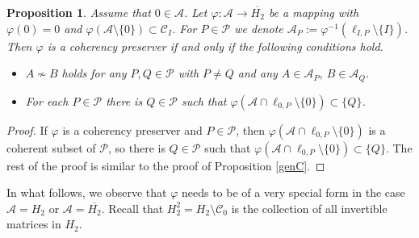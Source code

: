 \documentclass[10pt]{amsart}
\newtheorem{proposition}[theorem]{Proposition}
\theoremstyle{definition}
\theoremstyle{remark}
\numberwithin{subsection}{section}
\numberwithin{equation}{section}
\newcommand\cC{{\mathcal{C}}}
\newcommand\cP{{\mathcal{P}}}
\newcommand\oH{{\overline{H_2}}}
\begin{document}
\begin{proposition}\label{gena}
Assume that $0\in \mathcal{A}$. 
Let $\varphi\colon \mathcal{A}\to \oH$ be a mapping with $\varphi(0)=0$ and $\varphi(\mathcal{A}\setminus \{0\})\subset\mathcal{C}_I$. 
For $P\in \cP$ we denote $\mathcal{A}_P :=\varphi^{-1}(\ell_{I, P}\setminus \{I\})$.
Then $\varphi$ is a coherency preserver if and only if the following conditions hold. 
\begin{itemize}
\item $A\not\sim B$ holds for any $P, Q\in \mathcal{P}$ with $P \not=Q$ and any $A\in \mathcal{A}_P$, $B\in \mathcal{A}_Q$. 
\item For each $P\in \cP$ there is $Q\in \cP$ such that $\varphi(\mathcal{A}\cap \ell_{0, P}\setminus\{0\})\subset \{Q\}$.
\end{itemize}
\end{proposition}
\begin{proof}
If $\varphi$ is a coherency preserver and $P\in \cP$, then $\varphi(\mathcal{A}\cap \ell_{0, P}\setminus\{0\})$ is a coherent subset of $\cP$, so there is $Q\in \cP$ such that $\varphi(\mathcal{A}\cap \ell_{0, P}\setminus\{0\})\subset \{Q\}$. 
The rest of the proof is similar to the proof of Proposition \ref{genC}.
\end{proof}

In what follows, we observe that $\varphi$ needs to be of a very special form in the case  $\mathcal{A}=H_2$ or $\mathcal{A}=\oH$.  
Recall that $H_2^2= H_2\setminus \cC_0$ is the collection of all invertible matrices in $H_2$.
\end{document}
